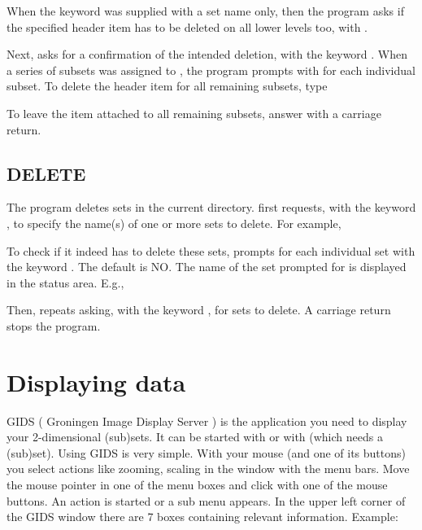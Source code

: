 
When the keyword  was supplied with a set name only,
then the program asks if the specified header item has to be deleted on
all lower levels too, with . 

Next,  asks for a confirmation of the intended deletion,
with the keyword .  When a series of subsets was assigned
to , the program prompts with  for each
individual subset.  To delete the header item for all remaining subsets,
type


To leave the item attached to all remaining subsets, answer
 with a carriage return. 

\subsection*{DELETE}

The program  deletes sets in the current directory. 
 first requests, with the keyword , to
specify the name(s) of one or more sets to delete.  For example,


To check if it indeed has to delete these sets,  prompts
for each individual set with the keyword .  The default is
NO.  The name of the set prompted for is displayed in the status area. 
E.g.,


Then,  repeats asking, with the keyword , for
sets to delete.  A carriage return stops the program. 

\section{Displaying data}

GIDS ( Groningen Image Display Server ) is the application you need to
display your 2-dimensional (sub)sets. It can be started with 
 or with  (which needs a (sub)set).
Using GIDS is very simple. With your mouse (and one of its buttons) you
select actions like zooming, scaling in the window with the menu bars.
Move the mouse pointer in one of the menu boxes and click with one of the 
mouse buttons. An action is started or a sub menu appears.
In the upper left corner of the GIDS window there are 7 boxes
containing relevant information. Example:

